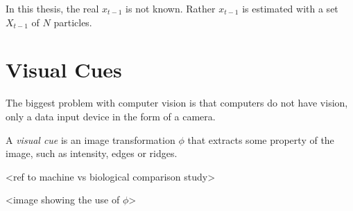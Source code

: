 In this thesis, the real $x_{t-1}$ is not known. Rather $x_{t-1}$ is
estimated with a set $X_{t-1}$ of $N$ particles.

\section{Visual Cues}

The biggest problem with computer vision is that computers do not have
vision, only a data input device in the form of a camera.

A \emph{visual cue} is an image transformation $\phi$ that extracts
some property of the image, such as intensity, edges or ridges.

<ref to machine vs biological comparison study>

<image showing the use of $\phi$>



